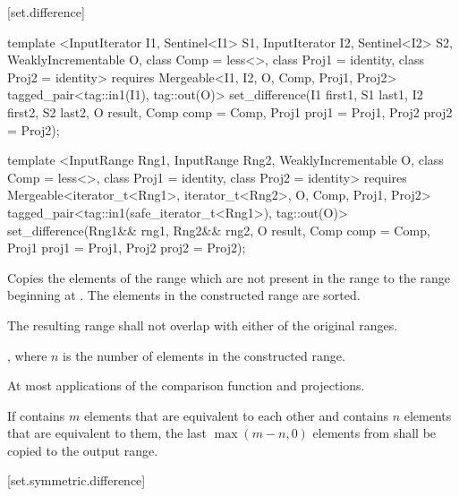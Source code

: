 [set.difference]{}

%
\begin{itemdecl}
template <InputIterator I1, Sentinel<I1> S1, InputIterator I2, Sentinel<I2> S2,
    WeaklyIncrementable O, class Comp = less<>, class Proj1 = identity, class Proj2 = identity>
  requires Mergeable<I1, I2, O, Comp, Proj1, Proj2>
  tagged_pair<tag::in1(I1), tag::out(O)>
    set_difference(I1 first1, S1 last1, I2 first2, S2 last2, O result,
                   Comp comp = Comp{}, Proj1 proj1 = Proj1{}, Proj2 proj2 = Proj2{});

template <InputRange Rng1, InputRange Rng2, WeaklyIncrementable O,
    class Comp = less<>, class Proj1 = identity, class Proj2 = identity>
  requires Mergeable<iterator_t<Rng1>, iterator_t<Rng2>, O, Comp, Proj1, Proj2>
  tagged_pair<tag::in1(safe_iterator_t<Rng1>), tag::out(O)>
    set_difference(Rng1&& rng1, Rng2&& rng2, O result,
                   Comp comp = Comp{}, Proj1 proj1 = Proj1{}, Proj2 proj2 = Proj2{});
\end{itemdecl}

\begin{itemdescr}
\pnum
\effects
Copies the elements of the range
which are not present in the range
to the range beginning at
.
The elements in the constructed range are sorted.

\pnum
\requires
The resulting range shall not overlap with either of the original ranges.

\pnum
\returns
{}, where $n$
is the number of elements in the constructed range.

\pnum
\complexity
At most
applications of the comparison function and projections.

\pnum
\notes
If
contains $m$
elements that are equivalent to each other and
contains $n$
elements that are equivalent to them, the last
$\max(m - n, 0)$
elements from
shall be copied to the output range.
\end{itemdescr}

[set.symmetric.difference]{}


